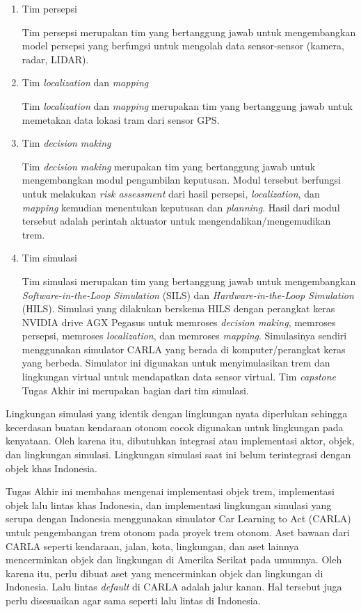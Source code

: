 \begin{enumerate}
    \item Tim persepsi

    Tim persepsi merupakan tim yang bertanggung jawab untuk mengembangkan model
    persepsi yang berfungsi untuk mengolah data sensor-sensor (kamera, radar,
    LIDAR).

    \item Tim \textit{localization} dan \textit{mapping}

    Tim \textit{localization} dan \textit{mapping} merupakan tim yang
    bertanggung jawab untuk memetakan data lokasi tram dari sensor GPS.

    \item Tim \textit{decision making}

    Tim \textit{decision making} merupakan tim yang bertanggung jawab untuk
    mengembangkan modul pengambilan keputusan. Modul tersebut berfungsi untuk
    melakukan \textit{risk assessment} dari hasil persepsi,
    \textit{localization}, dan \textit{mapping} kemudian menentukan keputusan
    dan \textit{planning}. Hasil dari modul tersebut adalah perintah aktuator
    untuk mengendalikan/mengemudikan trem.

    \item Tim simulasi

    Tim simulasi merupakan tim yang bertanggung jawab untuk mengembangkan
    \textit{Software-in-the-Loop Simulation} (SILS) dan
    \textit{Hardware-in-the-Loop Simulation} (HILS). Simulasi yang dilakukan
    berskema HILS dengan perangkat keras NVIDIA drive AGX Pegasus untuk memroses
    \textit{decision making}, memroses persepsi, memroses \textit{localization},
    dan memroses \textit{mapping}. Simulasinya sendiri menggunakan simulator
    CARLA yang berada di komputer/perangkat keras yang berbeda. Simulator ini
    digunakan untuk menyimulasikan trem dan lingkungan virtual untuk mendapatkan
    data sensor virtual. Tim \textit{capstone} Tugas Akhir ini merupakan bagian
    dari tim simulasi.

\end{enumerate}

Lingkungan simulasi yang identik dengan lingkungan nyata diperlukan sehingga
kecerdasan buatan kendaraan otonom cocok digunakan untuk lingkungan pada
kenyataan. Oleh karena itu, dibutuhkan integrasi atau implementasi aktor, objek,
dan lingkungan simulasi. Lingkungan simulasi saat ini belum terintegrasi dengan
objek khas Indonesia.

Tugas Akhir ini membahas mengenai implementasi objek trem, implementasi objek
lalu lintas khas Indonesia, dan implementasi lingkungan simulasi yang serupa
dengan Indonesia menggunakan simulator Car Learning to Act (CARLA) untuk
pengembangan trem otonom pada proyek trem otonom. Aset bawaan dari CARLA seperti
kendaraan, jalan, kota, lingkungan, dan aset lainnya mencerminkan objek dan
lingkungan di Amerika Serikat pada umumnya. Oleh karena itu, perlu dibuat aset
yang mencerminkan objek dan lingkungan di Indonesia. Lalu lintas
\textit{default} di CARLA adalah jalur kanan. Hal tersebut juga perlu
disesuaikan agar sama seperti lalu lintas di Indonesia.

